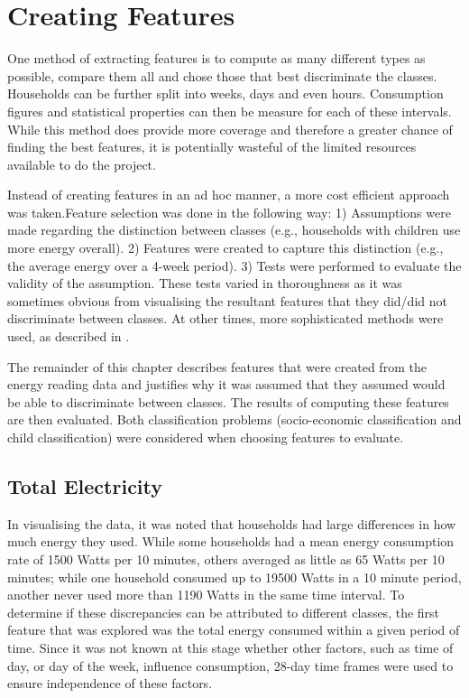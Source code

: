 \section{Creating Features}
One method of extracting features is to compute as many different types as possible, compare them all and chose those that best discriminate the classes. Households can be further split into weeks, days and even hours. Consumption figures and statistical properties can then be measure for each of these intervals. While this method does provide more coverage and therefore a greater chance of finding the best features, it is potentially wasteful of the limited resources available to do the project. 

Instead of creating features in an ad hoc manner, a more cost efficient approach was taken.Feature selection was done in the following way: 1) Assumptions were made regarding the distinction between classes (e.g., households with children use more energy overall). 2) Features were created to capture this distinction (e.g., the average energy over a 4-week period). 3) Tests were performed to evaluate the validity of the assumption. These tests varied in thoroughness as it was sometimes obvious from visualising the resultant features that they did/did not discriminate between classes. At other times, more sophisticated methods were used, as described in \featureSelectionSection.
\newline

The remainder of this chapter describes features that were created from the energy reading data and justifies why it was assumed that they assumed would be able to discriminate between classes. The results of computing these features are then evaluated. Both classification problems (socio-economic classification and child classification) were considered when choosing features to evaluate.

\subsection*{Total Electricity}
In visualising the data, it was noted that households had large differences in how much energy they used. While some households had a mean energy consumption rate of 1500 Watts per 10 minutes, others averaged as little as 65 Watts per 10 minutes; while one household consumed up to 19500 Watts in a 10 minute period, another never used more than 1190 Watts in the same time interval. To determine if these discrepancies can be attributed to different classes, the first feature that was explored was the total energy consumed within a given period of time. Since it was not known at this stage whether other factors, such as time of day, or day of the week, influence consumption, 28-day time frames were used to ensure independence of these factors.

